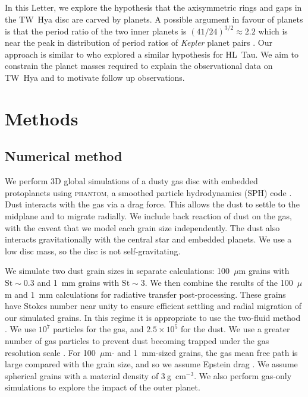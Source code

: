 \documentclass[usenatbib,a4paper,times]{mnras}
\newcommand{\st}{\mathrm{St}}
\renewcommand{\phantom}{\textsc{phantom}}
\begin{document}
In this Letter, we explore the hypothesis that the axisymmetric rings and gaps
in the TW~Hya disc are carved by planets. A possible argument in favour of
planets is that the period ratio of the two inner planets is
${(41/24)}^{3/2}\approx2.2$ which is near the peak in distribution of period
ratios of \emph{Kepler} planet pairs \citep{winn:2015}. Our approach is similar
to \citet{dipierro:2015} who explored a similar hypothesis for HL~Tau. We aim to
constrain the planet masses required to explain the observational data on TW~Hya
and to motivate follow up observations.










\section{Methods}
\label{sec:methods}

\subsection{Numerical method}

We perform 3D global simulations of a dusty gas disc with embedded protoplanets
using \phantom{}, a smoothed particle hydrodynamics (SPH) code
\citep{price:2018a}. Dust interacts with the gas via a drag force. This allows
the dust to settle to the midplane and to migrate radially. We include back
reaction of dust on the gas, with the caveat that we model each grain size
independently. The dust also interacts gravitationally with the central star
and embedded planets. We use a low disc mass, so the disc is not
self-gravitating.

We simulate two dust grain sizes in separate calculations: 100~$\mu$m grains
with $\st{}\sim 0.3$ and 1~mm grains with $\st{}\sim 3$. We then combine the
results of the 100~$\mu$m and 1~mm calculations for radiative transfer
post-processing. These grains have Stokes number near unity to ensure efficient
settling and radial migration of our simulated grains. In this regime it is
appropriate to use the two-fluid method \citep{laibe:2012a}. We use $10^7$
particles for the gas, and $2.5\times 10^5$ for the dust. We use a greater
number of gas particles to prevent dust becoming trapped under the gas
resolution scale \citep{laibe:2012a}. For 100~$\mu$m- and 1~mm-sized grains, the
gas mean free path is large compared with the grain size, and so we assume
Epstein drag \citet{epstein:1924}. We assume spherical grains with a material
density of $3\ $g~cm$^{-3}$. We also perform gas-only simulations to explore the
impact of the outer planet.
\end{document}
